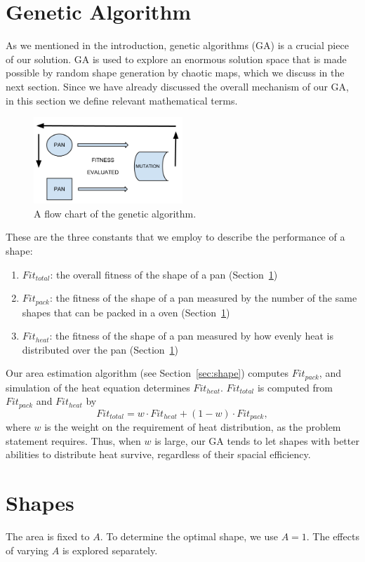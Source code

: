 \documentclass[12pt]{reedmcm}
\begin{document}
\section{Genetic Algorithm}
\label{sec:ga}
As we mentioned in the introduction, genetic algorithms (GA) is a crucial piece of our solution.
GA is used to explore an enormous solution space that is made possible by random shape generation by chaotic maps, which we discuss in the next section.
Since we have already discussed the overall mechanism of our GA, in this section we define relevant mathematical terms.
%
\begin{figure}[t]
  \centering
  \includegraphics[width=0.5\textwidth]{ga_flowchart}
  \caption{A flow chart of the genetic algorithm.}
  \label{fig:gaflow}
\end{figure}
%
These are the three constants that we employ to describe the performance of a shape:
\begin{enumerate}
  \item $Fit_{total}$: the overall fitness of the shape of a pan (Section~\ref{sec:ga})
  \item $Fit_{pack}$: the fitness of the shape of a pan measured by the number of the same shapes that can be packed in a oven (Section~\ref{sec:ga})
  \item $Fit_{heat}$: the fitness of the shape of a pan measured by how evenly heat is distributed over the pan (Section~\ref{sec:ga})
\end{enumerate}
Our area estimation algorithm (see Section~\ref{sec:shape}) computes $Fit_{pack}$, and simulation of the heat equation determines $Fit_{heat}$.
$Fit_{total}$ is computed from $Fit_{pack}$ and $Fit_{heat}$ by
\begin{equation*}
  Fit_{total} = w \cdot Fit_{heat} + (1-w) \cdot Fit_{pack},
\end{equation*}
where $w$ is the weight on the requirement of heat distribution, as the problem statement requires.
Thus, when $w$ is large, our GA tends to let shapes with better abilities to distribute heat survive, regardless of their spacial efficiency.

\section{Shapes}
\label{sec:shapes}
The area is fixed to $A$. To determine the optimal shape, we use $A=1$. The effects of varying $A$ is explored separately.
\end{document}
